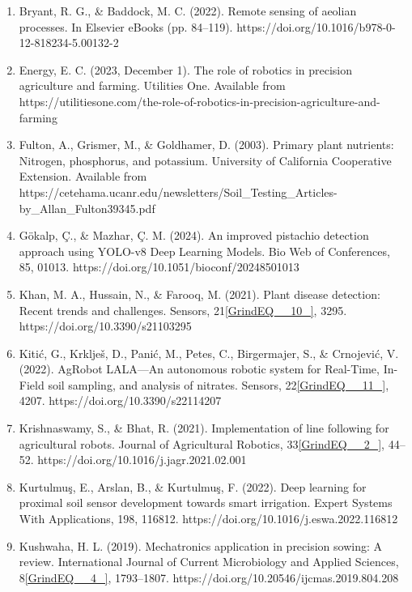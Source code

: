 \documentclass{book} %
\begin{document}
\begin{enumerate}
\item  Bryant, R. G., \& Baddock, M. C. (2022). Remote sensing of aeolian processes. In Elsevier eBooks (pp. 84--119). https://doi.org/10.1016/b978-0-12-818234-5.00132-2

\item  Energy, E. C. (2023, December 1). The role of robotics in precision agriculture and farming. Utilities One. Available from https://utilitiesone.com/the-role-of-robotics-in-precision-agriculture-and-farming

\item  Fulton, A., Grismer, M., \& Goldhamer, D. (2003). Primary plant nutrients: Nitrogen, phosphorus, and potassium. University of California Cooperative Extension. Available from https://cetehama.ucanr.edu/newsletters/Soil\_Testing\_Articles-by\_Allan\_Fulton39345.pdf

\item  G\"{o}kalp, \c{C}., \& Mazhar, \c{C}. M. (2024). An improved pistachio detection approach using YOLO-v8 Deep Learning Models. Bio Web of Conferences, 85, 01013. https://doi.org/10.1051/bioconf/20248501013

\item  Khan, M. A., Hussain, N., \& Farooq, M. (2021). Plant disease detection: Recent trends and challenges. Sensors, 21\eqref{GrindEQ__10_}, 3295. https://doi.org/10.3390/s21103295

\item  Kiti\'{c}, G., Krklje\v{s}, D., Pani\'{c}, M., Petes, C., Birgermajer, S., \& Crnojevi\'{c}, V. (2022). AgRobot LALA---An autonomous robotic system for Real-Time, In-Field soil sampling, and analysis of nitrates. Sensors, 22\eqref{GrindEQ__11_}, 4207. https://doi.org/10.3390/s22114207

\item  Krishnaswamy, S., \& Bhat, R. (2021). Implementation of line following for agricultural robots. Journal of Agricultural Robotics, 33\eqref{GrindEQ__2_}, 44--52. https://doi.org/10.1016/j.jagr.2021.02.001

\item  Kurtulmu\c{s}, E., Arslan, B., \& Kurtulmu\c{s}, F. (2022). Deep learning for proximal soil sensor development towards smart irrigation. Expert Systems With Applications, 198, 116812. https://doi.org/10.1016/j.eswa.2022.116812

\item  Kushwaha, H. L. (2019). Mechatronics application in precision sowing: A review. International Journal of Current Microbiology and Applied Sciences, 8\eqref{GrindEQ__4_}, 1793--1807. https://doi.org/10.20546/ijcmas.2019.804.208


\end{enumerate}
\end{document}
